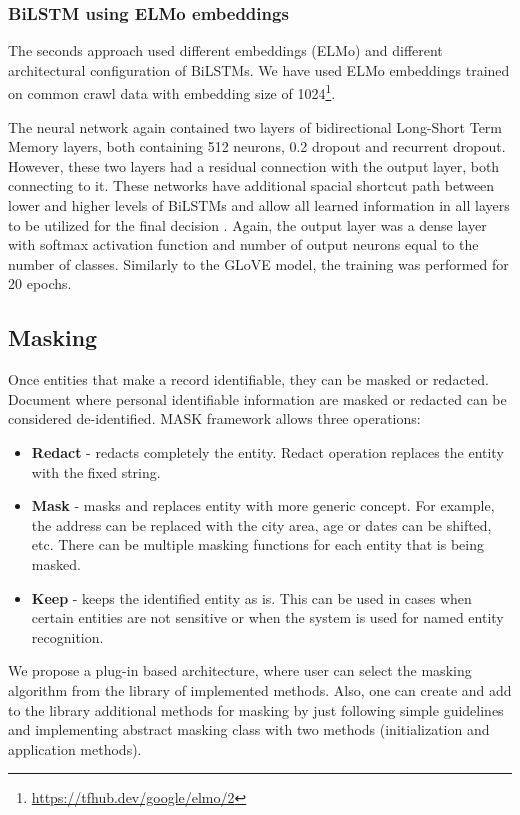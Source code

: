 \documentclass[a4paper,twoside]{article}
\begin{document}
\subsubsection{BiLSTM using ELMo embeddings}

The seconds approach used different embeddings (ELMo) and different architectural configuration of BiLSTMs. We have used ELMo embeddings \cite{Peters:2018} trained on common crawl data
 with embedding size of 1024\footnote{\url{https://tfhub.dev/google/elmo/2}}. 
 
 The neural network again contained two layers of bidirectional Long-Short Term Memory layers, both containing 512 neurons, 0.2 dropout and recurrent dropout. However, these two layers had a residual connection \cite{tran2017named} with the output layer, both connecting to it. These networks have additional spacial shortcut path between lower and higher levels of BiLSTMs and allow all learned information in all layers to be utilized for the final decision \cite{kim2017residual}. Again, the output layer was a dense layer with softmax activation function and number of output neurons equal to the number of classes. Similarly to the GLoVE model, the training was performed for 20 epochs. 
 
\subsection{Masking}

Once entities that make a record identifiable, they can be masked or redacted. Document where personal identifiable information are masked or redacted can be considered de-identified. MASK framework allows three operations:
\begin{itemize}
    \item \textbf{Redact} - redacts completely the entity. Redact operation replaces the entity with the fixed string.
    \item \textbf{Mask} - masks and replaces entity with more generic concept. For example, the address can be replaced with the city area, age or dates can be shifted, etc. There can be multiple masking functions for each entity that is being masked. 
    \item \textbf{Keep} - keeps the identified entity as is. This can be used in cases when certain entities are not sensitive or when the system is used for named entity recognition. 
\end{itemize}

We propose a plug-in based architecture, where user can select the masking algorithm from the library of implemented methods. Also, one can create and add to the library additional methods for masking by just following simple guidelines and implementing abstract masking class with two methods (initialization and application methods).
\end{document}
